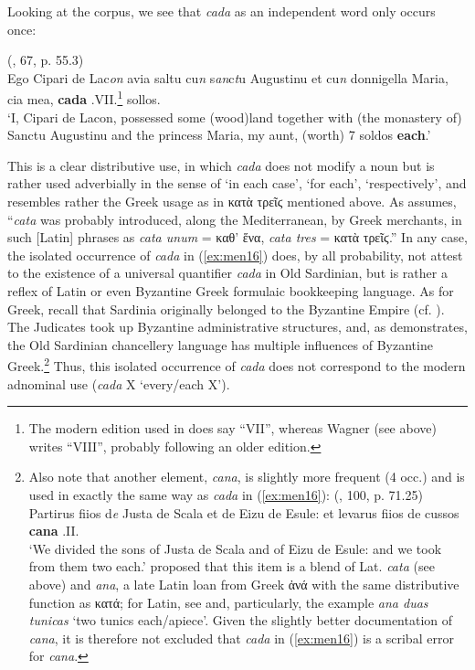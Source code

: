 \documentclass[output=paper,colorlinks,citecolor=brown]{langscibook}
\begin{document}
Looking at the corpus, we see that \textit{cada} as an independent word only occurs once:

\ea\label{ex:men16}(, 67, p. 55.3)\\
Ego Cipari de Lac\textit{on} avia saltu cu\textit{n} s\textit{an}c\textit{t}u Augustinu et cu\textit{n} donnigella Maria, cia mea, \textbf{cada} .VII.\footnote{The modern edition used in  does say “VII”, whereas Wagner (see above) writes “VIII”, probably following an older edition.} sollos.\\
‘I, Cipari de Lacon, possessed some (wood)land together with (the monastery of) Sanctu Augustinu and the princess Maria, my aunt, (worth) 7 soldos \textbf{each}.’
\z

This is a clear distributive use, in which \textit{cada} does not modify a noun but is rather used adverbially in the sense of ‘in each case’, ‘for each’, ‘respectively’, and resembles rather the Greek usage as in κατὰ τρεῖϛ mentioned above. As \citet[][37]{Grandgent1907} assumes, “\textit{cata} was probably introduced, along the Mediterranean, by Greek merchants, in such [Latin] phrases as \textit{cata unum} = καθ' ἕνα, \textit{cata tres} = κατὰ τρεῖϛ.” In any case, the isolated occurrence of \textit{cada} in (\ref{ex:men16}) does, by all probability, not attest to the existence of a universal quantifier \textit{cada} in Old Sardinian, but is rather a reflex of Latin or even Byzantine Greek formulaic bookkeeping language. As for Greek, recall that Sardinia originally belonged to the Byzantine Empire (cf. ). The Judicates took up Byzantine administrative structures, and, as \citet[][165--174]{Wagner1997} demonstrates, the Old Sardinian chancellery language has multiple influences of Byzantine Greek.\footnote{Also note that another element, \textit{cana}, is slightly more frequent (4 occ.) and is used in exactly the same way as \textit{cada} in (\ref{ex:men16}):
\ea  (, 100, p. 71.25)\\
     Partirus fiios d\textit{e} Justa de Scala et de Eizu de Esule: et levarus fiios de cussos \textbf{cana} .II.\\
    ‘We divided the sons of Justa de Scala and of Eizu de Esule: and we took from them two each.’
\z
\citet[][70]{MeyerLübke1902} proposed that this item is a blend of Lat. \textit{cata} (see above) and \textit{ana}, a late Latin loan from Greek ἀνά with the same distributive function as κατά; for Latin, see \citet[][254]{Hofmann1972} and, particularly, the example \textit{ana duas tunicas} ‘two tunics each/apiece’. Given the slightly better documentation of \textit{cana}, it is therefore not excluded that \textit{cada} in (\ref{ex:men16}) is a scribal error for \textit{cana}.} Thus, this isolated occurrence of \textit{cada} does not correspond to the modern adnominal use (\textit{cada} X ‘every/each X’).\largerpage[-1]
\end{document}
